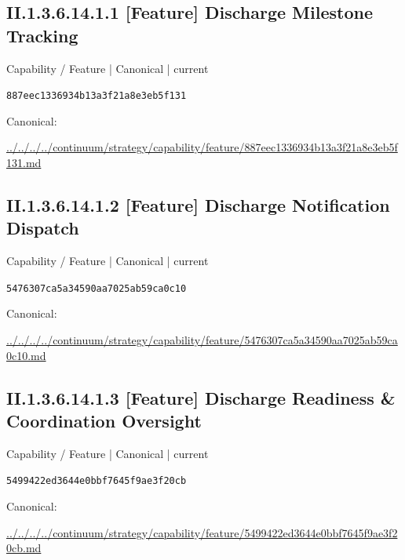 \documentclass[10pt,a4paper]{article}
\begin{document}
\subsection*{II.1.3.6.14.1.1 [Feature] Discharge Milestone Tracking}
\label{element-887eec1336934b13a3f21a8e3eb5f131}
{\small Capability / Feature | Canonical | current}\par
\texttt{887eec1336934b13a3f21a8e3eb5f131}\par
Canonical: \par
{\footnotesize\url{../../../../continuum/strategy/capability/feature/887eec1336934b13a3f21a8e3eb5f131.md}}\par
\subsection*{II.1.3.6.14.1.2 [Feature] Discharge Notification Dispatch}
\label{element-5476307ca5a34590aa7025ab59ca0c10}
{\small Capability / Feature | Canonical | current}\par
\texttt{5476307ca5a34590aa7025ab59ca0c10}\par
Canonical: \par
{\footnotesize\url{../../../../continuum/strategy/capability/feature/5476307ca5a34590aa7025ab59ca0c10.md}}\par
\subsection*{II.1.3.6.14.1.3 [Feature] Discharge Readiness \& Coordination Oversight}
\label{element-5499422ed3644e0bbf7645f9ae3f20cb}
{\small Capability / Feature | Canonical | current}\par
\texttt{5499422ed3644e0bbf7645f9ae3f20cb}\par
Canonical: \par
{\footnotesize\url{../../../../continuum/strategy/capability/feature/5499422ed3644e0bbf7645f9ae3f20cb.md}}\par
\end{document}

